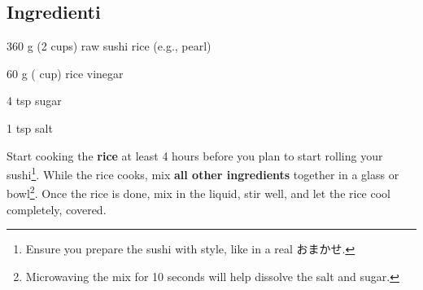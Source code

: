 \newpage
{}

\subsection{Ingredienti}
\begin{ingredients}
	\item 360 g (2 cups) raw sushi rice (e.g., pearl)
	\item 60 g ( cup) rice vinegar
	\item 4 tsp sugar
	\item 1 tsp salt
\end{ingredients}

\medskip

Start cooking the \textbf{rice} at least 4 hours before you plan to start rolling your sushi\footnote{Ensure you prepare the sushi with style, like in a real {\japanesefont おまかせ.}}.
While the rice cooks, mix \textbf{all other ingredients} together in a glass or bowl\footnote{Microwaving the mix for 10 seconds will help dissolve the salt and sugar.}.
Once the rice is done, mix in the liquid, stir well, and let the rice cool completely, covered.

\vspace*{0.75 cm}

\begin{recipeblock}
	
\end{recipeblock}
